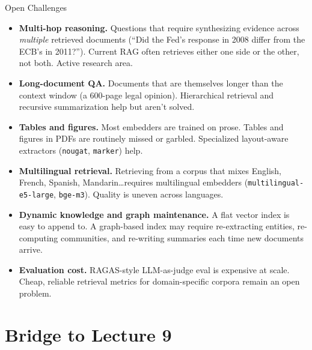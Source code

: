\begin{frame}{Open Challenges}
\begin{itemize}
\item \textbf{Multi-hop reasoning.} Questions that require synthesizing evidence across \emph{multiple} retrieved documents (``Did the Fed's response in 2008 differ from the ECB's in 2011?''). Current RAG often retrieves either one side or the other, not both. Active research area.

\medskip
\item \textbf{Long-document QA.} Documents that are themselves longer than the context window (a 600-page legal opinion). Hierarchical retrieval and recursive summarization help but aren't solved.

\medskip
\item \textbf{Tables and figures.} Most embedders are trained on prose. Tables and figures in PDFs are routinely missed or garbled. Specialized layout-aware extractors (\texttt{nougat}, \texttt{marker}) help.

\medskip
\item \textbf{Multilingual retrieval.} Retrieving from a corpus that mixes English, French, Spanish, Mandarin\dots requires multilingual embedders (\texttt{multilingual-e5-large}, \texttt{bge-m3}). Quality is uneven across languages.

\medskip
\item \textbf{Dynamic knowledge and graph maintenance.} A flat vector index is easy to append to. A graph-based index may require re-extracting entities, re-computing communities, and re-writing summaries each time new documents arrive.

\medskip
\item \textbf{Evaluation cost.} RAGAS-style LLM-as-judge eval is expensive at scale. Cheap, reliable retrieval metrics for domain-specific corpora remain an open problem.
\end{itemize}
\end{frame}

\section{Bridge to Lecture 9}


